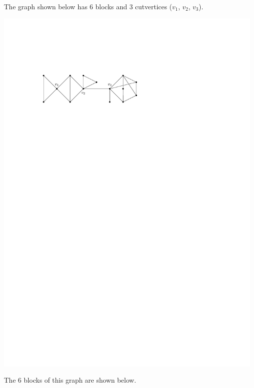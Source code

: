 \begin{Example}\label{ex:Blocks}
The graph shown below has $6$ blocks and $3$ cutvertices ($v_1$, $v_2$, $v_3$).
\begin{center}
\includegraphics{Images/6BlockGraph2.pdf}
\end{center}
The $6$ blocks of this graph are shown below.
\begin{center}

\end{center}
\end{Example}
